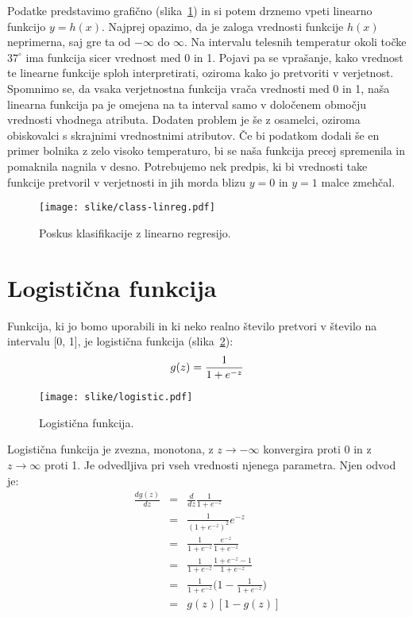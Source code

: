 Podatke predstavimo grafično (slika~\ref{f:class-linreg}) in si potem drznemo vpeti linearno funkcijo $y=h(x)$. Najprej opazimo, da je zaloga vrednosti funkcije $h(x)$ neprimerna, saj gre ta od $-\infty$ do $\infty$. Na intervalu telesnih temperatur okoli točke $37^{\circ}$ ima funkcija sicer vrednost med 0 in 1. Pojavi pa se vprašanje, kako vrednost te linearne funkcije sploh interpretirati, oziroma kako jo pretvoriti v verjetnost. Spomnimo se, da vsaka verjetnostna funkcija vrača vrednosti med 0 in 1, naša linearna funkcija pa je omejena na ta interval samo v določenem območju vrednosti vhodnega atributa. Dodaten problem je še z osamelci, oziroma obiskovalci s skrajnimi vrednostnimi atributov. Če bi podatkom dodali še en primer bolnika z zelo visoko temperaturo, bi se naša funkcija precej spremenila in pomaknila nagnila v desno. Potrebujemo nek predpis, ki bi vrednosti take funkcije pretvoril v verjetnosti in jih morda blizu $y=0$ in $y=1$ malce zmehčal.

\begin{figure}[htbp]
\begin{center}
\texttt{[image: slike/class-linreg.pdf]}
\caption{Poskus klasifikacije z linearno regresijo.}
\label{f:class-linreg}
\end{center}
\end{figure}

\section{Logistična funkcija}

Funkcija, ki jo bomo uporabili in ki neko realno število pretvori v število na intervalu [0, 1], je logistična funkcija (slika~\ref{f:logistic-function}):
\begin{equation}
  g(z) = {1\over 1+e^{-z}}
\end{equation}

\begin{figure}[htbp]
\begin{center}
\texttt{[image: slike/logistic.pdf]}
\caption{Logistična funkcija.}
\label{f:logistic-function}
\end{center}
\end{figure}

Logistična funkcija je zvezna, monotona, z $z\to -\infty$ konvergira proti 0 in z $z\to\infty$ proti 1. Je odvedljiva pri vseh vrednosti njenega parametra. Njen odvod je:
\begin{eqnarray}
  \frac{dg(z)}{dz} & = & \frac{d}{dz} \frac{1}{1+e^{-z}} \nonumber \\
  & = & \frac{1}{(1+e^{-z})^2} e^{-z} \nonumber \\
  & = & \frac{1}{1+e^{-z}}\frac{e^{-z}}{1+e^{-z}} \nonumber \\
  & = & \frac{1}{1+e^{-z}}\frac{1+e^{-z}-1}{1+e^{-z}} \nonumber \\
  & = & \frac{1}{1+e^{-z}}\big(1-\frac{1}{1+e^{-z}}\big) \nonumber \\
  & = & g(z)[1-g(z)]
\end{eqnarray}


